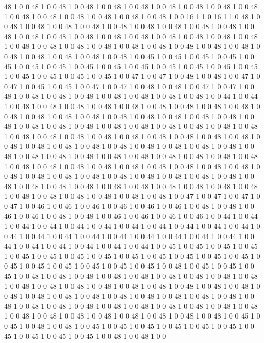 48
1
0
0
48
1
0
0
48
1
0
0
48
1
0
0
48
1
0
0
48
1
0
0
48
1
0
0
48
1
0
0
48
1
0
0
48
1
0
0
48
1
0
0
48
1
0
0
48
1
0
0
48
1
0
0
48
1
0
0
48
1
0
0
16
1
1
0
16
1
1
0
48
1
0
0
48
1
0
0
48
1
0
0
48
1
0
0
48
1
0
0
48
1
0
0
48
1
0
0
48
1
0
0
48
1
0
0
48
1
0
0
48
1
0
0
48
1
0
0
48
1
0
0
48
1
0
0
48
1
0
0
48
1
0
0
48
1
0
0
48
1
0
0
48
1
0
0
48
1
0
0
48
1
0
0
48
1
0
0
48
1
0
0
48
1
0
0
48
1
0
0
48
1
0
0
48
1
0
0
48
1
0
0
48
1
0
0
48
1
0
0
48
1
0
0
48
1
0
0
48
1
0
0
48
1
0
0
45
1
0
0
45
1
0
0
45
1
0
0
45
1
0
0
45
1
0
0
45
1
0
0
45
1
0
0
45
1
0
0
45
1
0
0
45
1
0
0
45
1
0
0
45
1
0
0
45
1
0
0
45
1
0
0
45
1
0
0
45
1
0
0
45
1
0
0
45
1
0
0
47
1
0
0
47
1
0
0
48
1
0
0
48
1
0
0
47
1
0
0
47
1
0
0
45
1
0
0
45
1
0
0
47
1
0
0
47
1
0
0
48
1
0
0
48
1
0
0
47
1
0
0
47
1
0
0
48
1
0
0
48
1
0
0
48
1
0
0
48
1
0
0
48
1
0
0
48
1
0
0
48
1
0
0
48
1
0
0
44
1
0
0
44
1
0
0
48
1
0
0
48
1
0
0
48
1
0
0
48
1
0
0
48
1
0
0
48
1
0
0
48
1
0
0
48
1
0
0
48
1
0
0
48
1
0
0
48
1
0
0
48
1
0
0
48
1
0
0
48
1
0
0
48
1
0
0
48
1
0
0
48
1
0
0
48
1
0
0
48
1
0
0
48
1
0
0
48
1
0
0
48
1
0
0
48
1
0
0
48
1
0
0
48
1
0
0
48
1
0
0
48
1
0
0
48
1
0
0
48
1
0
0
48
1
0
0
48
1
0
0
48
1
0
0
48
1
0
0
48
1
0
0
48
1
0
0
48
1
0
0
48
1
0
0
48
1
0
0
48
1
0
0
48
1
0
0
48
1
0
0
48
1
0
0
48
1
0
0
48
1
0
0
48
1
0
0
48
1
0
0
48
1
0
0
48
1
0
0
48
1
0
0
48
1
0
0
48
1
0
0
48
1
0
0
48
1
0
0
48
1
0
0
48
1
0
0
48
1
0
0
48
1
0
0
48
1
0
0
48
1
0
0
48
1
0
0
48
1
0
0
48
1
0
0
48
1
0
0
48
1
0
0
48
1
0
0
48
1
0
0
48
1
0
0
48
1
0
0
48
1
0
0
48
1
0
0
48
1
0
0
48
1
0
0
48
1
0
0
48
1
0
0
48
1
0
0
48
1
0
0
48
1
0
0
48
1
0
0
48
1
0
0
48
1
0
0
48
1
0
0
48
1
0
0
48
1
0
0
48
1
0
0
48
1
0
0
48
1
0
0
48
1
0
0
48
1
0
0
48
1
0
0
48
1
0
0
47
1
0
0
47
1
0
0
47
1
0
0
47
1
0
0
46
1
0
0
46
1
0
0
46
1
0
0
46
1
0
0
46
1
0
0
46
1
0
0
48
1
0
0
48
1
0
0
46
1
0
0
46
1
0
0
48
1
0
0
48
1
0
0
46
1
0
0
46
1
0
0
46
1
0
0
46
1
0
0
44
1
0
0
44
1
0
0
44
1
0
0
44
1
0
0
44
1
0
0
44
1
0
0
44
1
0
0
44
1
0
0
44
1
0
0
44
1
0
0
44
1
0
0
44
1
0
0
44
1
0
0
44
1
0
0
44
1
0
0
44
1
0
0
44
1
0
0
44
1
0
0
44
1
0
0
44
1
0
0
44
1
0
0
44
1
0
0
44
1
0
0
44
1
0
0
44
1
0
0
44
1
0
0
45
1
0
0
45
1
0
0
45
1
0
0
45
1
0
0
45
1
0
0
45
1
0
0
45
1
0
0
45
1
0
0
45
1
0
0
45
1
0
0
45
1
0
0
45
1
0
0
45
1
0
0
45
1
0
0
45
1
0
0
45
1
0
0
45
1
0
0
45
1
0
0
45
1
0
0
48
1
0
0
45
1
0
0
45
1
0
0
45
1
0
0
48
1
0
0
48
1
0
0
48
1
0
0
48
1
0
0
48
1
0
0
48
1
0
0
48
1
0
0
48
1
0
0
48
1
0
0
48
1
0
0
48
1
0
0
48
1
0
0
48
1
0
0
48
1
0
0
48
1
0
0
48
1
0
0
48
1
0
0
48
1
0
0
48
1
0
0
48
1
0
0
48
1
0
0
48
1
0
0
48
1
0
0
48
1
0
0
48
1
0
0
48
1
0
0
48
1
0
0
48
1
0
0
48
1
0
0
48
1
0
0
48
1
0
0
48
1
0
0
48
1
0
0
48
1
0
0
48
1
0
0
48
1
0
0
48
1
0
0
48
1
0
0
48
1
0
0
48
1
0
0
48
1
0
0
48
1
0
0
48
1
0
0
48
1
0
0
48
1
0
0
45
1
0
0
45
1
0
0
48
1
0
0
48
1
0
0
45
1
0
0
45
1
0
0
45
1
0
0
45
1
0
0
45
1
0
0
45
1
0
0
45
1
0
0
45
1
0
0
45
1
0
0
45
1
0
0
48
1
0
0
48
1
0
0
